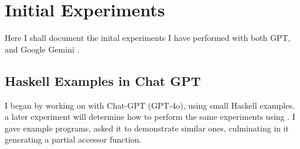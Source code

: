\section{Initial Experiments}
Here I shall document the inital experiments I have performed with both GPT, and
Google Gemini \citet{gemini2023}. 

\subsection{Haskell Examples in Chat GPT}
I began by working on with Chat-GPT (GPT-4o), using small Haskell examples, a later
experiment will determine how to perform the same experiments using .
I gave example programs, asked it to demonstrate similar ones, culminating in it
generating a partial accessor function.